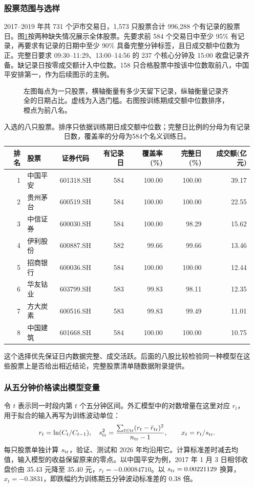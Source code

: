 \documentclass[11pt,a4paper]{article}
\newcommand{\chart}[4]{\begin{figure}[H]\centering\resizebox{#1\linewidth}{!}{}\caption{#3}\label{#4}\end{figure}}
\begin{document}
\subsubsection{股票范围与选样}
2017--2019 年共 731 个沪市交易日，1,573 只股票合计 996,288 个有记录的股票日。图\ref{fig:universe}按两种缺失情况展示全体股票。先要求前 584 个交易日中至少 95\% 有记录，再要求有记录的日期中至少 90\% 具备完整分钟标签，且日成交额中位数为正。完整日要求 09:30--11:29、13:00--14:56 的 237 个核心分钟及 15:00 收盘记录齐备。缺记录日按零成交额计入中位数。158 只合格股票中按该中位数取前八，中国平安排第一，作为后续图示的主例。
\chart{.98}{universe_selection}{左图每点为一只股票，横轴衡量有多少天留下记录，纵轴衡量记录齐全的日期占比。虚线为入选门槛。右图按训练期成交额中位数排序，橙点为前八名。}{fig:universe}
\begin{table}[H]\centering\small
\caption{入选的八只股票。排序只依据训练期日成交额中位数；完整日比例的分母为有记录日数，覆盖率的分母为584个名义训练日。}
\label{tab:selected_stocks}
\begin{tabular}{rlcrrrr}\toprule
排名 & 股票 & 证券代码 & 有记录日 & 覆盖率(\%) & 完整日(\%) & 成交额(亿元)\\\midrule
1 & 中国平安 & 601318.SH & 584 & 100.00 & 100.00 & 39.17\\
2 & 贵州茅台 & 600519.SH & 584 & 100.00 & 100.00 & 22.55\\
3 & 中信证券 & 600030.SH & 584 & 100.00 & 98.29 & 15.62\\
4 & 伊利股份 & 600887.SH & 582 & 99.66 & 99.66 & 13.46\\
5 & 招商银行 & 600036.SH & 584 & 100.00 & 100.00 & 12.44\\
6 & 华友钴业 & 603799.SH & 583 & 99.83 & 98.11 & 12.35\\
7 & 方大炭素 & 600516.SH & 583 & 99.83 & 99.49 & 11.01\\
8 & 中国建筑 & 601668.SH & 584 & 100.00 & 100.00 & 10.75\\
\bottomrule\end{tabular}\end{table}

这个选择优先保证日内数据完整、成交活跃。后面的八股比较检验同一种模型在这些股票上是否给出相近结论，完整股票清单随数据附录提供。

\clearpage
\subsubsection{从五分钟价格读出模型变量}
令 $t$ 表示同一时段内第 $t$ 个五分钟区间。外汇模型中的对数增量在这里对应 $r_t$，用于拟合的输入再写为训练波动单位：
\begin{equation}
 r_t=\ln(C_t/C_{t-1}),\quad
 s_{\rm tr}^2=\frac{\sum_{t\in{\rm tr}}(r_t-\bar r_{\rm tr})^2}{n_{\rm tr}-1},
 \qquad x_t=r_t/s_{\rm tr}. \label{eq:returns}
\end{equation}
每只股票单独计算 $s_{\rm tr}$，验证、测试和 2026 年均沿用它。计算标准差时减去均值，输入模型的收益保留原来的零点。以中国平安为例，2017 年 1 月 3 日相邻收盘价由 35.43 元降至 35.40 元，$r_t=-0.00084710$。以 $s_{\rm tr}=0.00221129$ 换算，$x_t=-0.3831$，即跌幅约为训练期五分钟波动标准差的 0.38 倍。
\end{document}
